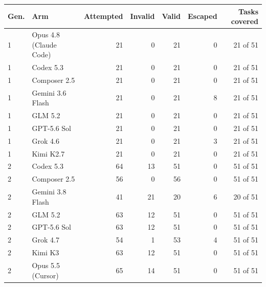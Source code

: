 \begin{tabular}{@{}llrrrrr@{}}
\toprule
Gen. & Arm & Attempted & Invalid & Valid & Escaped & Tasks covered \\
\midrule
1 & Opus 4.8 (Claude Code) & 21 & 0 & 21 & 0 & 21 of 51 \\
1 & Codex 5.3 & 21 & 0 & 21 & 0 & 21 of 51 \\
1 & Composer 2.5 & 21 & 0 & 21 & 0 & 21 of 51 \\
1 & Gemini 3.6 Flash & 21 & 0 & 21 & 8 & 21 of 51 \\
1 & GLM 5.2 & 21 & 0 & 21 & 0 & 21 of 51 \\
1 & GPT-5.6 Sol & 21 & 0 & 21 & 0 & 21 of 51 \\
1 & Grok 4.6 & 21 & 0 & 21 & 3 & 21 of 51 \\
1 & Kimi K2.7 & 21 & 0 & 21 & 0 & 21 of 51 \\
\midrule
2 & Codex 5.3 & 64 & 13 & 51 & 0 & 51 of 51 \\
2 & Composer 2.5 & 56 & 0 & 56 & 0 & 51 of 51 \\
2 & Gemini 3.8 Flash & 41 & 21 & 20 & 6 & 20 of 51 \\
2 & GLM 5.2 & 63 & 12 & 51 & 0 & 51 of 51 \\
2 & GPT-5.6 Sol & 63 & 12 & 51 & 0 & 51 of 51 \\
2 & Grok 4.7 & 54 & 1 & 53 & 4 & 51 of 51 \\
2 & Kimi K3 & 63 & 12 & 51 & 0 & 51 of 51 \\
2 & Opus 5.5 (Cursor) & 65 & 14 & 51 & 0 & 51 of 51 \\
\bottomrule
\end{tabular}
